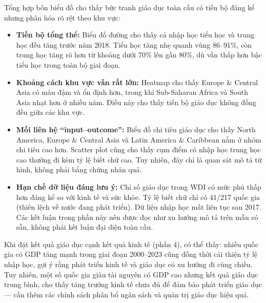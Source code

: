 Tổng hợp bốn biểu đồ cho thấy bức tranh giáo dục toàn cầu có tiến bộ đáng kể nhưng phân hóa rõ rệt theo khu vực:

\begin{itemize}
    \item \textbf{Tiến bộ tổng thể:} Biểu đồ đường cho thấy cả nhập học tiểu học và trung học đều tăng trước năm 2018. Tiểu học tăng nhẹ quanh vùng 86--91\%, còn trung học tăng rõ hơn từ khoảng dưới 70\% lên gần 80\%, dù vẫn thấp hơn bậc tiểu học trong toàn bộ giai đoạn.

    \item \textbf{Khoảng cách khu vực vẫn rất lớn:} Heatmap cho thấy Europe \& Central Asia có màu đậm và ổn định hơn, trong khi Sub-Saharan Africa và South Asia nhạt hơn ở nhiều năm. Điều này cho thấy tiến bộ giáo dục không đồng đều giữa các khu vực.

    \item \textbf{Mối liên hệ ``input--outcome'':} Biểu đồ chi tiêu giáo dục cho thấy North America, Europe \& Central Asia và Latin America \& Caribbean nằm ở nhóm chi tiêu cao hơn. Scatter plot cũng cho thấy cụm điểm có nhập học trung học cao thường đi kèm tỷ lệ biết chữ cao. Tuy nhiên, đây chỉ là quan sát mô tả từ hình, không phải bằng chứng nhân quả.

    \item \textbf{Hạn chế dữ liệu đáng lưu ý:} Chỉ số giáo dục trong WDI có mức phủ thấp hơn đáng kể so với kinh tế và sức khỏe. Tỷ lệ biết chữ chỉ có 41/217 quốc gia (thiên lệch về nước đang phát triển). Dữ liệu nhập học mất liên tục sau 2017. Các kết luận trong phần này nên được đọc như xu hướng mô tả trên mẫu có sẵn, không phải kết luận đại diện toàn cầu.
\end{itemize}

Khi đặt kết quả giáo dục cạnh kết quả kinh tế (phần 4), có thể thấy: nhiều quốc gia có GDP tăng mạnh trong giai đoạn 2000--2023 cũng đồng thời cải thiện tỷ lệ nhập học, gợi ý rằng phát triển kinh tế và giáo dục có xu hướng đi cùng chiều. Tuy nhiên, một số quốc gia giàu tài nguyên có GDP cao nhưng kết quả giáo dục trung bình, cho thấy tăng trưởng kinh tế chưa đủ để đảm bảo phát triển giáo dục --- cần thêm các chính sách phân bổ ngân sách và quản trị giáo dục hiệu quả.
